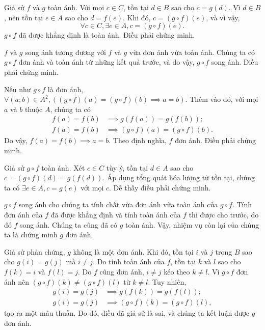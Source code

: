\stepSubexercise Giả sử $f$ và $g$ toàn ánh. Với mọi $c \in C$, tồn tại $d \in B$ sao cho $c = g(d)$. Vì $d \in B$, nên tồn tại $e \in A$ sao cho $d = f(e)$. Khi đó, $c = (g\circ f)(e)$, và vì vậy, \begin{equation*}
   \forall c \in C, \exists e \in A, c = (g \circ f)(e).
\end{equation*}
$g \circ f$ đã được khẳng định là toàn ánh. Điều phải chứng minh.

\stepSubexercise $f$ và $g$ song ánh tương đương với $f$ và $g$ vừa đơn ánh vừa toàn ánh. Chúng ta có $g \circ f$ đơn ánh và toàn ánh từ những kết quả trước, và do vậy, $g \circ f$ song ánh. Điều phải chứng minh.

\stepSubexercise Nếu như $g\circ f$ là đơn ánh, $\forall (a; b) \in A^2, \left((g \circ f)(a) = (g \circ f)(b) \implies a = b\right)$. Thêm vào đó, với mọi $a$ và $b$ thuộc $A$, chúng ta có
\begin{align*}
   f(a) = f(b) &\implies g(f(a)) = g(f(b)); \\
   f(a) = f(b) &\implies (g \circ f)(a) = (g \circ f)(b).
\end{align*}
Do vậy, $f(a) = f(b) \implies a = b$. Theo định nghĩa, $f$ đơn ánh. Điều phải chứng minh.

\stepSubexercise Giả sử $g \circ f$ toàn ánh. Xét $c \in C$ tùy ý, tồn tại $d \in A$ sao cho $c = (g \circ f)(d) = g(f(d))$. Áp dụng tổng quát hóa lượng từ tồn tại, chúng ta có $\exists e \in A, c = g(e)$ với mọi $c$. Dễ thấy điều phải chứng minh.

\stepSubexercise $g \circ f$ song ánh cho chúng ta tính chất vừa đơn ánh vừa toàn ánh của $g \circ f$. Tính đơn ánh của $f$ đã được khẳng định và tính toàn ánh của $f$ thì được cho trước, do đó $f$ song ánh. Chúng ta cũng đã có $g$ toàn ánh. Vậy, nhiệm vụ còn lại của chúng ta là chứng minh $g$ đơn ánh.

Giả sử phản chứng, $g$ không là một đơn ánh. Khi đó, tồn tại $i$ và $j$ trong $B$ sao cho $g(i) = g(j)$ mà $i \neq j$. Do tính toàn ánh của $f$, tồn tại $k$ và $l$ sao cho $f(k) = i$ và $f(l) = j$. Do $f$ cũng đơn ánh, $i \neq j$ kéo theo $k \neq l$. Vì $g \circ f$ đơn ánh nên $(g \circ f)(k) \neq (g \circ f)(l)$ từ $k \neq l$. Tuy nhiên,
\begin{align*}
   g(i) = g(j) &\implies g(f(k)) = g(f(l)); \\
   g(i) = g(j) &\implies (g \circ f)(k) = (g \circ f)(l),
\end{align*}
tạo ra một mâu thuẫn. Do đó, điều đã giả sử là sai, và chúng ta kết luận được $g$ đơn ánh.

